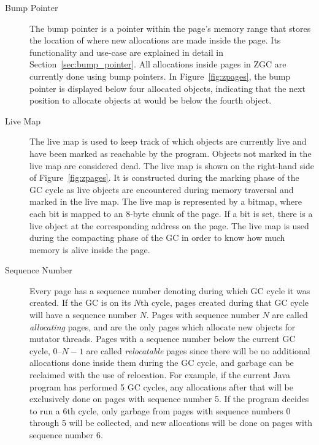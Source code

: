 \begin{description}
    \item[Bump Pointer]
        The bump pointer is a pointer within the page's memory range that stores the location of where new allocations are made inside the page. Its functionality and use-case are explained in detail in Section~\ref{sec:bump_pointer}. All allocations inside pages in ZGC are currently done using bump pointers. In Figure~\ref{fig:zpages}, the bump pointer is displayed below four allocated objects, indicating that the next position to allocate objects at would be below the fourth object.

    \item[Live Map]
        The live map is used to keep track of which objects are currently live and have been marked as reachable by the program. Objects not marked in the live map are considered dead. The live map is shown on the right-hand side of Figure~\ref{fig:zpages}. It is constructed during the marking phase of the GC cycle as live objects are encountered during memory traversal and marked in the live map. The live map is represented by a bitmap, where each bit is mapped to an 8-byte chunk of the page. If a bit is set, there is a live object at the corresponding address on the page. The live map is used during the compacting phase of the GC in order to know how much memory is alive inside the page.
        \newpage
    \item[Sequence Number]
        Every page has a sequence number denoting during which GC cycle it was created. If the GC is on its $N$th cycle, pages created during that GC cycle will have a sequence number $N$. Pages with sequence number $N$ are called \textit{allocating} pages, and are the only pages which allocate new objects for mutator threads. Pages with a sequence number below the current GC cycle, $0$--$N-1$ are called \textit{relocatable} pages since there will be no additional allocations done inside them during the GC cycle, and garbage can be reclaimed with the use of relocation. For example, if the current Java program has performed 5 GC cycles, any allocations after that will be exclusively done on pages with sequence number 5. If the program decides to run a 6th cycle, only garbage from pages with sequence numbers 0 through 5 will be collected, and new allocations will be done on pages with sequence number 6.


\end{description}
